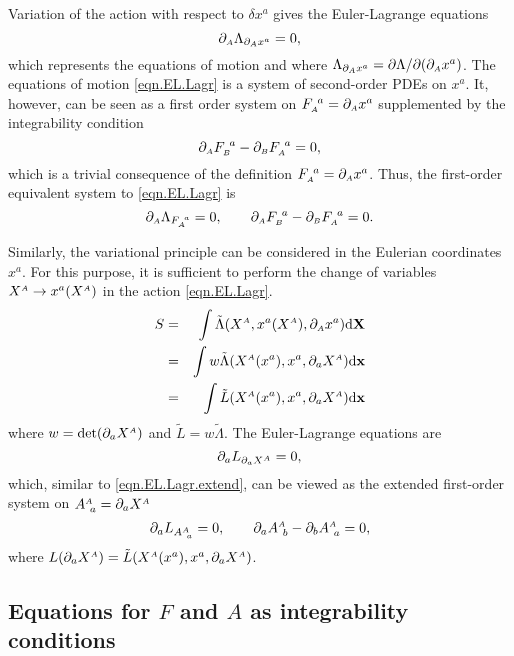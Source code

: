 \documentclass[
10pt, %
a4paper, %
oneside, %
headinclude,footinclude, %
BCOR5mm, %
]{scrartcl}
\newcommand{\xx}{\mathbf{x}}
\newcommand{\XX}{\mathbf{X}}
\newcommand{\dX}{\mathrm{d}\XX}
\newcommand{\dx}{\mathrm{d}\xx}
\newcommand{\sA}{\mathsmaller A}
\newcommand{\sB}{\mathsmaller B}
\newcommand{\pd}{\partial}
\newcommand{\F}[2]{F^{\ #1}_{\mathsmaller#2}}
\newcommand{\A}[2]{A^{\mathsmaller#1}_{\ #2}}
\begin{document}
Variation of the action with respect to $ \delta x^a $ gives the Euler-Lagrange equations
\begin{equation}\label{eqn.EL.Lagr}
\pd_\sA \Lambda_{\pd_\sA x^a} = 0,
\end{equation}
which represents the equations of motion and where $ 
\Lambda_{\pd_\sA x^a} = \pd\Lambda/\pd (\pd_\sA x^a)$. The equations of motion \eqref{eqn.EL.Lagr} 
is 
a system of second-order PDEs on $ x^a $. It, however, can be seen as a first order system on $ 
\F{a}{A} = \pd_\sA x^a$ supplemented by the integrability condition 
\begin{equation}\label{eqn.integrability.F}
\pd_\sA \F{a}{B} - \pd_\sB \F{a}{A} = 0,
\end{equation}
which is a trivial consequence of the definition $ \F{a}{A} = \pd_\sA x^a $. Thus, the first-order 
equivalent system to \eqref{eqn.EL.Lagr} is
\begin{equation}\label{eqn.EL.Lagr.extend}
\pd_\sA \Lambda_{\F{a}{A}} = 0, \qquad \pd_\sA \F{a}{B} - \pd_\sB \F{a}{A} = 0.
\end{equation}

Similarly, the variational principle can be considered in the Eulerian coordinates $ x^a $. For 
this 
purpose, it is sufficient to perform the change of variables $ X^\sA \rightarrow x^a(X^\sA) $ in 
the action \eqref{eqn.EL.Lagr}.
\begin{eqnarray}
S &=& \int \tilde{\Lambda}(X^\sA,x^a(X^\sA),\pd_\sA x^a)\dX \nonumber\\
  &=& \int w \tilde{\Lambda}(X^\sA(x^a),x^a,\pd_a X^\sA)\dx \nonumber\\
  &=& \int \tilde{L}(X^\sA(x^a),x^a,\pd_a X^\sA)\dx
\end{eqnarray}
where $ w = \det(\pd_a X^\sA) $ and $ \tilde{L} = w \tilde{\Lambda} $. The Euler-Lagrange equations 
are
\begin{equation}
\pd_a L_{\pd_a X^\sA} = 0,
\end{equation}
which, similar to \eqref{eqn.EL.Lagr.extend}, can be viewed as the extended first-order system on $ 
\A{A}{a} = \pd_a X^\sA$
\begin{equation}
\pd_a L_{\A{A}{a}} = 0, \qquad \pd_a \A{A}{b} - \pd_b \A{A}{a} = 0,
\end{equation}
where $ L(\pd_a X^\sA) = \tilde{L}(X^\sA(x^a),x^a,\pd_a X^\sA) $.



\subsection{Equations for $ F $ and $ A $ as integrability conditions}
\end{document}
